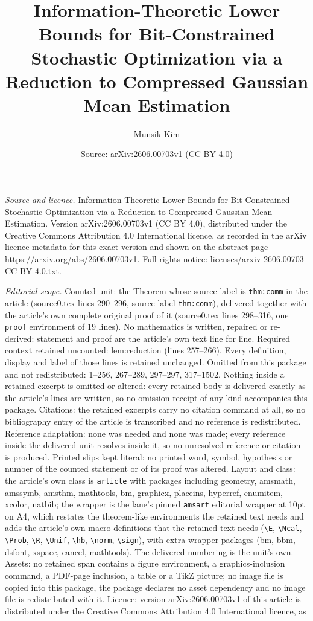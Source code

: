 \documentclass[10pt,a4paper]{amsart}
\title[Information-Theoretic Lower Bounds for Bit-Constrained Stoch]{Information-Theoretic Lower Bounds for Bit-Constrained Stochastic Optimization via a Reduction to Compressed Gaussian Mean Estimation}
\author{Munsik Kim}
\date{Source: arXiv:2606.00703v1 (CC BY 4.0)}
\begin{document}
\maketitle

\noindent\emph{Source and licence.} Information-Theoretic Lower Bounds for Bit-Constrained Stochastic Optimization via a Reduction to Compressed Gaussian Mean Estimation. Version arXiv:2606.00703v1 (CC BY 4.0), distributed under the Creative Commons Attribution 4.0 International licence, as recorded in the arXiv licence metadata for this exact version and shown on the abstract page https://arxiv.org/abs/2606.00703v1. Full rights notice: licenses/arxiv-2606.00703-CC-BY-4.0.txt.\par\smallskip

\noindent\textit{Editorial scope.} Counted unit: the Theorem whose source label is \texttt{thm:comm} in the article (source0.tex lines 290--296, source label \texttt{thm:comm}), delivered together with the article's own complete original proof of it (source0.tex lines 298--316, one \texttt{proof} environment of 19 lines). No mathematics is written, repaired or re-derived: statement and proof are the article's own text line for line. Required context retained uncounted: lem:reduction (lines 257--266). Every definition, display and label of those lines is retained unchanged. Omitted from this package and not redistributed: 1--256, 267--289, 297--297, 317--1502. Nothing inside a retained excerpt is omitted or altered: every retained body is delivered exactly as the article's lines are written, so no omission receipt of any kind accompanies this package. Citations: the retained excerpts carry no citation command at all, so no bibliography entry of the article is transcribed and no reference is redistributed. Reference adaptation: none was needed and none was made; every reference inside the delivered unit resolves inside it, so no unresolved reference or citation is produced. Printed slips kept literal: no printed word, symbol, hypothesis or number of the counted statement or of its proof was altered. Layout and class: the article's own class is \texttt{article} with packages including geometry, amsmath, amssymb, amsthm, mathtools, bm, graphicx, placeins, hyperref, enumitem, xcolor, natbib; the wrapper is the lane's pinned \texttt{amsart} editorial wrapper at 10pt on A4, which restates the theorem-like environments the retained text needs and adds the article's own macro definitions that the retained text needs (\texttt{\textbackslash E}, \texttt{\textbackslash Ncal}, \texttt{\textbackslash Prob}, \texttt{\textbackslash R}, \texttt{\textbackslash Unif}, \texttt{\textbackslash hb}, \texttt{\textbackslash norm}, \texttt{\textbackslash sign}), with extra wrapper packages (bm, bbm, dsfont, xspace, cancel, mathtools). The delivered numbering is the unit's own. Assets: no retained span contains a figure environment, a graphics-inclusion command, a PDF-page inclusion, a table or a TikZ picture; no image file is copied into this package, the package declares no asset dependency and no image file is redistributed with it. Licence: version arXiv:2606.00703v1 of this article is distributed under the Creative Commons Attribution 4.0 International licence, as 
\end{document}
